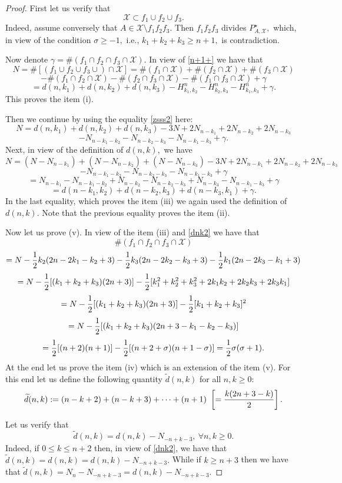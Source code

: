 \documentclass[10pt,a4paper]{amsart}
\newcommand{\Xset}{\mathcal{X}}
\begin{document}
\begin{proof}
First let us verify that 
\begin{equation}\label{n+1+}
	\Xset\subset f_1\cup f_2 \cup f_3. 
\end{equation} Indeed, assume conversely that $A\in \Xset\setminus f_1f_2f_3.$
Then $f_1f_2f_3$ divides $P^\star_{A,\Xset},$ which, in view of the condition $\sigma\ge -1,$ i.e., $k_1+k_2+k_3\ge n+1,$ is contradiction.

Now denote $\gamma=\#(f_1\cap f_2\cap f_3 \cap \Xset).$ 
In view of \eqref{n+1+} we have that
$$ N=\#[(f_1\cup f_2\cup f_3 \cup)\cap \Xset]=   \#(f_1 \cap \Xset)+ \#(f_2\cap \Xset)+ \#(f_3 \cap \Xset)$$ $$-
\#(f_1\cap f_2 \cap \Xset) - \#(f_2\cap f_3 \cap \Xset) - \#(f_1\cap f_3 \cap \Xset) +\gamma$$
$$=d(n,k_1)+d(n,k_2)+d(n,k_3)-H_{k_1,k_2}^n-H_{k_2,k_3}^n-H_{k_1,k_3}^n+\gamma.$$ This proves the item (i).

Then we continue by using the equality \eqref{zsss2} here:
$$N= d(n,k_1)+d(n,k_2)+d(n,k_3)-3N+2N_{n-k_1}+2N_{n-k_2}+2N_{n-k_3}$$ $$-N_{n-k_1-k_2}-N_{n-k_2-k_3}-N_{n-k_1-k_3}+\gamma.$$
Next, in view of the definition of $d(n,k),$ we have
$$N= (N-N_{n-k_1})+(N-N_{n-k_2})+(N-N_{n-k_3})-3N+2N_{n-k_1}+2N_{n-k_2}+2N_{n-k_3}$$
$$-N_{n-k_1-k_2}-N_{n-k_2-k_3}-N_{n-k_1-k_3}+\gamma$$ 
$$=N_{n-k_1}-N_{n-k_1-k_2}+N_{n-k_2}-N_{n-k_2-k_3}+N_{n-k_3}-N_{n-k_1-k_3}+\gamma$$
$$=d(n-k_1, k_2)+d(n-k_2,k_3)+d(n-k_3,k_1)+\gamma.$$
In the last equality, which proves the item (iii) we again used the definition of $d(n,k).$ Note that the previous equality proves the item (ii).

Now let us prove (v).
In view of the item (iii) and \eqref{dnk2} we have that
$$\#(f_1\cap f_2\cap f_3 \cap \Xset)$$ 
$$= N- {1\over 2} k_2(2n-2k_1-k_2+3)- {1\over 2} k_3(2n-2k_2-k_3+3)- {1\over 2} k_1(2n-2k_3-k_1+3)$$
$$= N-{1\over 2} [(k_1+k_2+k_3)(2n+3)]-{1\over 2}[k_1^2+k_2^2+k_3^2+2k_1k_2+2k_2k_3+2k_3k_1]$$ 
$$= N-{1\over 2} [(k_1+k_2+k_3)(2n+3)]-{1\over 2}[k_1+k_2+k_3]^2$$ 
$$= N-{1\over 2} [(k_1+k_2+k_3)(2n+3-k_1-k_2-k_3)]$$ 
$$= {1\over 2} [(n+2)(n+1)]-{1\over 2} [(n+2+\sigma)(n+1-\sigma)]= {1\over 2} \sigma(\sigma+1).$$ 
At the end let us prove the item (iv) which is an extension of the item (v).
For this end let us define the following quantity $\widetilde d(n,k)$ for all $n,k\ge 0:$ 
\begin{equation}\label{dnk3+}\widetilde d(n, k) := (n-k+2)+(n-k+3)+\cdots+(n+1)\ \left[={k(2n+3-k)\over 2}\right].\end{equation}

Let us verify that 
\begin{equation}\label{dnk3++}\widetilde d(n, k)=d(n,k)-N_{-n+k-3},\ \forall n,k\ge 0.\end{equation}
Indeed, if $0\le k\le n+2$ then, in view of \eqref{dnk2}, we have that $ \widetilde d(n, k)=d(n,k)=d(n,k)-N_{-n+k-3}.$
While if  $k\ge n+3$ then we have that $ \widetilde d(n, k)=N_n-N_{-n+k-3}=d(n,k)-N_{-n+k-3}.$


\end{proof}
\end{document}
